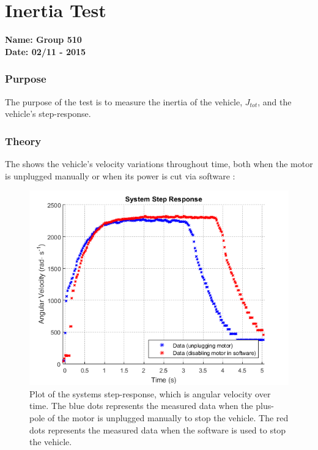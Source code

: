 \pagebreak
\section{Inertia Test}
\nopagebreak
\textbf{Name: Group 510}\\
\textbf{Date: 02/11 - 2015}

\subsubsection{Purpose}
The purpose of the test is to measure the inertia of the vehicle, $J_{tot}$, and the vehicle's step-response.

\subsubsection{Theory}
The  shows the vehicle's velocity variations throughout time, both when the motor is unplugged manually or when its power is cut via software :

\begin{figure}[H]
  \centering
  \includegraphics[scale=0.8]{figures/inertiaTestPowerCutOrDisable.png}
  \caption{Plot of the systems step-response, which is angular velocity over time. The blue dots represents the measured data when the plus-pole of the motor is unplugged manually to stop the vehicle. The red dots represents the measured data when the software is used to stop the vehicle.}
  \label{inertiaTestPowerCutOrDisable}
\end{figure}

